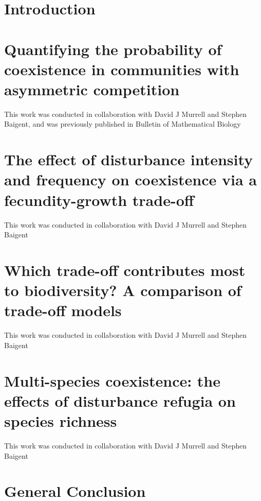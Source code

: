 \documentclass[a4paper]{report}
\begin{document}
\tableofcontents
\listoffigures
\listoftables


    \newpage
    \setcounter{chapter}{-1}
\chapter{Introduction}


\newpage
\chapter{Quantifying the probability of coexistence in communities with asymmetric competition}
This work was conducted in collaboration with David J Murrell and Stephen Baigent, and was previously published in Bulletin of Mathematical Biology \citep{nattrass2012quantifying}


\newpage
\chapter{The effect of disturbance intensity and frequency on coexistence via a fecundity-growth trade-off}
This work was conducted in collaboration with David J Murrell and Stephen Baigent


\newpage
\chapter{Which trade-off contributes most to biodiversity? A comparison of trade-off models}
This work was conducted in collaboration with David J Murrell and Stephen Baigent


\newpage
\chapter{Multi-species coexistence: the effects of disturbance refugia on species richness}
This work was conducted in collaboration with David J Murrell and Stephen Baigent



\newpage
\chapter{General Conclusion}


   \newpage



\pagebreak
\end{document}
